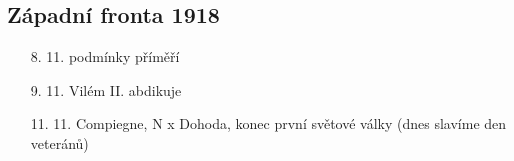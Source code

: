 \documentclass{article}
\begin{document}
\subsection*{Západní fronta 1918}
\begin{itemize}
    \vspace{-0.5em}
    \setlength\itemsep{0.15em}
    \item[8. 11.]  podmínky příměří
    \item[9. 11.]  Vilém II. abdikuje
    \item[11. 11.]  Compiegne, N x Dohoda, konec první světové války (dnes slavíme den veteránů)
\end{itemize}
\end{document}
